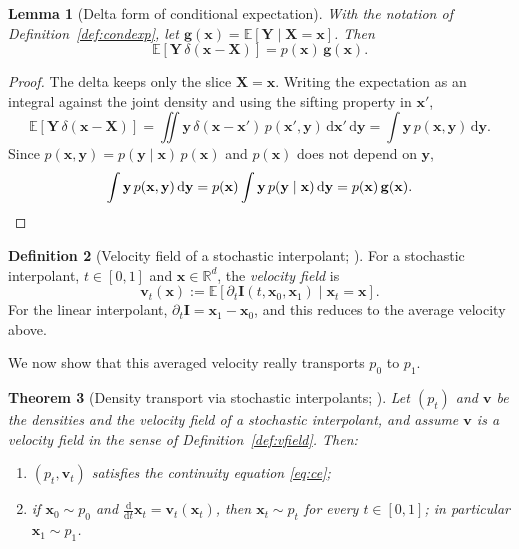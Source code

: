 \documentclass[11pt,a4paper]{article}
\numberwithin{equation}{section}     %
\theoremstyle{plain}        %
\newtheorem{theorem}{Theorem}[section]
\newtheorem{lemma}[theorem]{Lemma}
\theoremstyle{definition}   %
\newtheorem{definition}[theorem]{Definition}
\theoremstyle{remark}       %
\begin{document}
\begin{lemma}[Delta form of conditional expectation]\label{lem:deltacond}
With the notation of Definition~\ref{def:condexp}, let $\mathbf{g}(\mathbf{x})=\mathbb{E}[\mathbf{Y}\mid\mathbf{X}=\mathbf{x}]$. Then
\[
\mathbb{E}\left[\mathbf{Y}\,\delta(\mathbf{x}-\mathbf{X})\right]=p(\mathbf{x})\,\mathbf{g}(\mathbf{x}).
\]
\end{lemma}

\begin{proof}
The delta keeps only the slice $\mathbf{X}=\mathbf{x}$. Writing the expectation as an integral against the joint density and using the sifting property in $\mathbf{x}'$,
\[
\mathbb{E}\left[\mathbf{Y}\,\delta(\mathbf{x}-\mathbf{X})\right]
=\iint\mathbf{y}\,\delta(\mathbf{x}-\mathbf{x}')\,p(\mathbf{x}',\mathbf{y})\,\mathrm{d}\mathbf{x}'\,\mathrm{d}\mathbf{y}
=\int\mathbf{y}\,p(\mathbf{x},\mathbf{y})\,\mathrm{d}\mathbf{y}.
\]
Since $p(\mathbf{x},\mathbf{y})=p(\mathbf{y}\mid\mathbf{x})\,p(\mathbf{x})$ and $p(\mathbf{x})$ does not depend on $\mathbf{y}$,
\[
\int\mathbf{y}\,p(\mathbf{x},\mathbf{y})\,\mathrm{d}\mathbf{y}=p(\mathbf{x})\int\mathbf{y}\,p(\mathbf{y}\mid\mathbf{x})\,\mathrm{d}\mathbf{y}=p(\mathbf{x})\,\mathbf{g}(\mathbf{x}). \qedhere
\]
\end{proof}

\begin{definition}[Velocity field of a stochastic interpolant; \citealp{albergo2023building}]\label{def:sivelocity}
For a stochastic interpolant, $t\in[0,1]$ and $\mathbf{x}\in\mathbb{R}^d$, the \emph{velocity field} is
\[
\mathbf{v}_t(\mathbf{x}):=\mathbb{E}\left[\partial_t\mathbf{I}(t,\mathbf{x}_0,\mathbf{x}_1)\mid\mathbf{x}_t=\mathbf{x}\right].
\]
For the linear interpolant, $\partial_t\mathbf{I}=\mathbf{x}_1-\mathbf{x}_0$, and this reduces to the average velocity above.
\end{definition}

We now show that this averaged velocity really transports $p_0$ to $p_1$.

\begin{theorem}[Density transport via stochastic interpolants; \citealp{albergo2023building,albergo2023stochastic}]\label{thm:interp}
Let $(p_t)$ and $\mathbf{v}$ be the densities and the velocity field of a stochastic interpolant, and assume $\mathbf{v}$ is a velocity field in the sense of Definition~\ref{def:vfield}. Then:
\begin{enumerate}[label=(\roman*)]
\item $(p_t,\mathbf{v}_t)$ satisfies the continuity equation \eqref{eq:ce};
\item if $\mathbf{x}_0\sim p_0$ and $\frac{\mathrm{d}}{\mathrm{d}t}\mathbf{x}_t=\mathbf{v}_t(\mathbf{x}_t)$, then $\mathbf{x}_t\sim p_t$ for every $t\in[0,1]$; in particular $\mathbf{x}_1\sim p_1$.
\end{enumerate}
\end{theorem}
\end{document}
